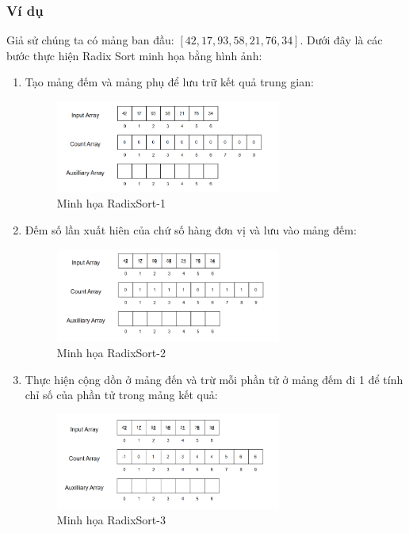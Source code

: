 \subsubsection{Ví dụ}

Giả sử chúng ta có mảng ban đầu: $[42, 17, 93, 58, 21, 76, 34]$. Dưới đây là các bước thực hiện Radix Sort minh họa bằng hình ảnh:

\begin{enumerate}
    \item Tạo mảng đếm và mảng phụ để lưu trữ kết quả trung gian:
    \begin{figure}[H]
        \centering
        \includegraphics[width=0.7\textwidth]{img/radix_sort/1.png}
        \caption{Minh họa RadixSort-1}
    \end{figure}
    
    \item Đếm số lần xuất hiên của chứ số hàng đơn vị và lưu vào mảng đếm:
    \begin{figure}[H]
        \centering
        \includegraphics[width=0.7\textwidth]{img/radix_sort/2.png}
        \caption{Minh họa RadixSort-2}
    \end{figure}
    
    \item Thực hiện cộng dồn ở mảng đến và trừ mỗi phần tử ở mảng đếm đi 1 để tính chỉ số của phần tử trong mảng kết quả:
    \begin{figure}[H]
        \centering
        \includegraphics[width=0.7\textwidth]{img/radix_sort/3.png}
        \caption{Minh họa RadixSort-3}
    \end{figure}
    

\end{enumerate}
